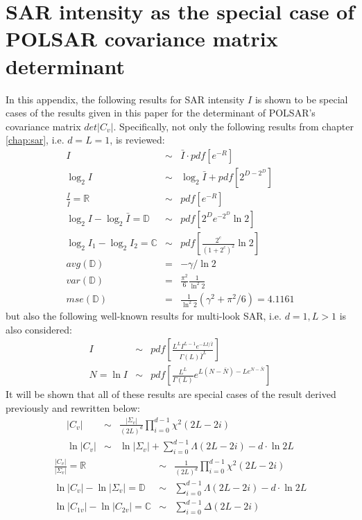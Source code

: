 \section{SAR intensity as the special case of POLSAR covariance matrix determinant}
\label{sec:appendix_sar_special_case_of_polsar}

In this appendix, the following results for SAR intensity $I$ is shown to be special cases of the results given in this paper for the determinant of POLSAR's covariance matrix $det|C_v|$.
Specifically, not only the following results from chapter \ref{chap:sar}, i.e. $d=L=1$, is reviewed:
\begin{eqnarray}
  I &\sim& \bar{I} \cdot pdf \left[ e^{-R} \right] \\
  \log_2{I} &\sim& \log_2{\bar{I}} + pdf \left[ 2^{D-2^D} \right] \\
  \frac{I}{\bar{I}} = \mathbb{R} &\sim& pdf \left[ e^{-R} \right]  \\
  \log_2{I} - \log_2{\bar{I}} = \mathbb{D} &\sim& pdf \left[ 2^De^{-2^D}\ln2 \right]\\
  \log_2{I_1} - \log_2{I_2} = \mathbb{C} &\sim& pdf \left[ \frac{2^c}{(1+2^c)^2} \ln2 \right] \\
  avg(\mathbb{D}) &=& -\gamma / \ln{2} \\
  var(\mathbb{D}) &=& \frac{\pi^2}{6} \frac{1}{ \ln^2{2}} \\
  mse(\mathbb{D}) &=& \frac{1}{\ln^2{2}}( \gamma^2 + \pi^2/6 ) = 4.1161 
\end{eqnarray}
but also the following well-known results for multi-look SAR, i.e. $d=1,L>1$ is also considered:
  \begin{eqnarray}
I &\sim& pdf \left[ \frac{L^L I^{L-1} e^{-LI/\bar{I}}}{\Gamma(L) \bar{I}^L} \right] \\
N = \ln{I} &\sim& pdf \left[ \frac{L^L}{\Gamma(L)} e^{L(N-\bar{N})-Le^{N-\bar{N}}} \right]
  \end{eqnarray}
It will be shown that all of these results are special cases of the result derived previously and rewritten below:
\begin{eqnarray}
  |C_v| &\sim& \frac{|\Sigma_v|}{(2L)^d} \prod^{d-1}_{i=0} \chi^2(2L-2i)  \label{eqn:polsar_det_cov_dist} \\
  \ln{|C_v|} &\sim& \ln{|\Sigma_v|} + \sum^{d-1}_{i=0} \Lambda(2L-2i) - d \cdot \ln{2L} \label{eqn:polsar_log_det_cov_dist} 
\end{eqnarray}
\begin{eqnarray}
  \frac{|C_v|}{|\Sigma_v|} = \mathbb{R} &\sim& \frac{1}{(2L)^d} \prod^{d-1}_{i=0} \chi^2(2L-2i) \label{eqn:polsar_ratio_det_cov_dist} \\
  \ln{|C_v|} - \ln{|\Sigma_v|} = \mathbb{D} &\sim& \sum^{d-1}_{i=0} \Lambda(2L-2i) - d \cdot \ln{2L} \label{eqn:polsar_dispersion_log_det_cov_dist} \\ 
  \ln{|C_{1v}|} - \ln{|C_{2v}|} = \mathbb{C} &\sim& \sum^{d-1}_{i=0} \Delta(2L-2i)
\end{eqnarray}
